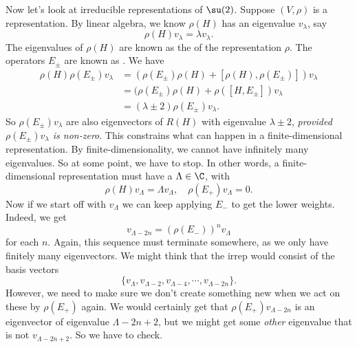 \documentclass[a4paper]{article}
\begin{document}
Now let's look at irreducible representations of $\su(2)$. Suppose $(V, \rho)$ is a representation. By linear algebra, we know $\rho(H)$ has an eigenvalue $v_\lambda$, say
\[
  \rho(H) v_\lambda = \lambda v_\lambda.
\]
The eigenvalues of $\rho(H)$ are known as the  of the representation $\rho$. The operators $E_{\pm}$ are known as . We have
\begin{align*}
  \rho(H) \rho(E_{\pm}) v_\lambda &= (\rho(E_{\pm})\rho(H) + [\rho(H), \rho(E_{\pm})])v_\lambda \\
  &= (\rho(E_{\pm})\rho(H) + \rho([H, E_{\pm}]) v_\lambda \\
  &= (\lambda \pm 2) \rho(E_{\pm}) v_\lambda.
\end{align*}
So $\rho(E_{\pm}) v_\lambda$ are also eigenvectors of $R(H)$ with eigenvalue $\lambda \pm 2$, \emph{provided $\rho(E_{\pm})v_\lambda$ is non-zero}. This constrains what can happen in a finite-dimensional representation. By finite-dimensionality, we cannot have infinitely many eigenvalues. So at some point, we have to stop. In other words, a finite-dimensional representation must have a  $\Lambda \in \C$, with
\[
  \rho(H)v_\Lambda = \Lambda v_\Lambda,\quad \rho(E_+) v_\Lambda = 0.
\]
Now if we start off with $v_\Lambda$ we can keep applying $E_-$ to get the lower weights. Indeed, we get
\[
  v_{\Lambda - 2n} = (\rho(E_-))^n v_\Lambda
\]
for each $n$. Again, this sequence must terminate somewhere, as we only have finitely many eigenvectors. We might think that the irrep would consist of the basis vectors
\[
  \{v_\Lambda, v_{\Lambda - 2}, v_{\Lambda - 4}, \cdots, v_{\Lambda - 2n}\}.
\]
However, we need to make sure we don't create something new when we act on these by $\rho(E_+)$ again. We would certainly get that $\rho(E_+)v_{\Lambda - 2n}$ is an eigenvector of eigenvalue $\Lambda - 2n + 2$, but we might get some \emph{other} eigenvalue that is not $v_{\Lambda - 2n + 2}$. So we have to check.
\end{document}

